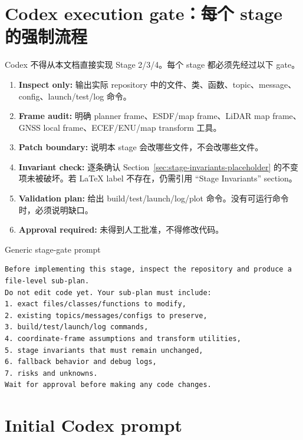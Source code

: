 \documentclass[11pt,a4paper]{article}
\begin{document}
\section{Codex execution gate：每个 stage 的强制流程}

Codex 不得从本文档直接实现 Stage 2/3/4。每个 stage 都必须先经过以下 gate。

\begin{enumerate}
  \item \textbf{Inspect only:} 输出实际 repository 中的文件、类、函数、topic、message、config、launch/test/log 命令。
  \item \textbf{Frame audit:} 明确 planner frame、ESDF/map frame、LiDAR map frame、GNSS local frame、ECEF/ENU/map transform 工具。
  \item \textbf{Patch boundary:} 说明本 stage 会改哪些文件，不会改哪些文件。
  \item \textbf{Invariant check:} 逐条确认 Section~\ref{sec:stage-invariants-placeholder} 的不变项未被破坏。若 LaTeX label 不存在，仍需引用 ``Stage Invariants'' section。
  \item \textbf{Validation plan:} 给出 build/test/launch/log/plot 命令。没有可运行命令时，必须说明缺口。
  \item \textbf{Approval required:} 未得到人工批准，不得修改代码。
\end{enumerate}

\begin{codexbox}{Generic stage-gate prompt}
\begin{lstlisting}
Before implementing this stage, inspect the repository and produce a file-level sub-plan.
Do not edit code yet. Your sub-plan must include:
1. exact files/classes/functions to modify,
2. existing topics/messages/configs to preserve,
3. build/test/launch/log commands,
4. coordinate-frame assumptions and transform utilities,
5. stage invariants that must remain unchanged,
6. fallback behavior and debug logs,
7. risks and unknowns.
Wait for approval before making any code changes.
\end{lstlisting}
\end{codexbox}

\section{Initial Codex prompt}
\end{document}
